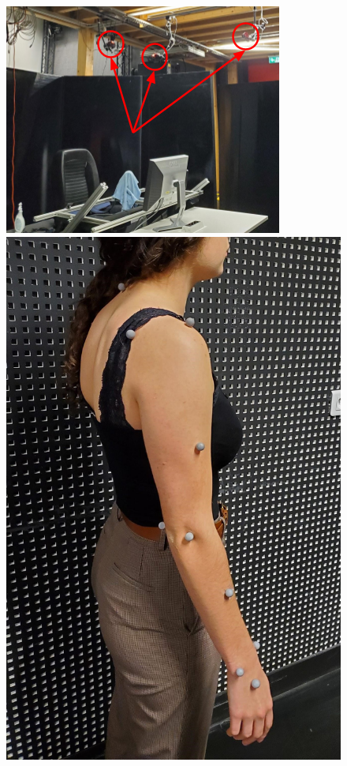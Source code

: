 \begin{figure}[!htb]
    \centering
    \captionsetup{justification=centering}
    \begin{minipage}{0.59\linewidth}
        \centering
        \includegraphics[clip, width=1\linewidth]{img/chapter_5/motion_capture_01.png}
    \end{minipage}
    \hfill
    \begin{minipage}{0.4\linewidth}
        \centering
        \includegraphics[clip,width=0.785\linewidth]{img/chapter_5/markers_02.jpg}

\end{minipage}
\end{figure}
